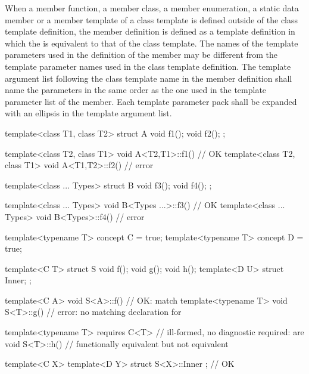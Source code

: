 \pnum
When a member function, a member class, a member enumeration, a static data member or
a member template of a class
template is defined outside of the class template definition,
the member definition is defined as a template definition in which the
 is equivalent to that
of the class template.
The names of the template parameters used in the definition of the member may
be different from the template parameter names used in the class
template definition.
The template argument list following the class template name in the member
definition shall name the parameters in the same order as the one used in
the template parameter list of the member. Each template
parameter pack shall be expanded with an ellipsis in the template
argument list.
\begin{example}
\begin{codeblock}
template<class T1, class T2> struct A {
  void f1();
  void f2();
};

template<class T2, class T1> void A<T2,T1>::f1() { }    // OK
template<class T2, class T1> void A<T1,T2>::f2() { }    // error
\end{codeblock}

\begin{codeblock}
template<class ... Types> struct B {
  void f3();
  void f4();
};

template<class ... Types> void B<Types ...>::f3() { }   // OK
template<class ... Types> void B<Types>::f4() { }       // error
\end{codeblock}

\begin{codeblock}
template<typename T> concept C = true;
template<typename T> concept D = true;

template<C T> struct S {
  void f();
  void g();
  void h();
  template<D U> struct Inner;
};

template<C A> void S<A>::f() { }        // OK:  match
template<typename T> void S<T>::g() { } // error: no matching declaration for 

template<typename T> requires C<T>      // ill-formed, no diagnostic required:  are
void S<T>::h() { }                      // functionally equivalent but not equivalent

template<C X> template<D Y>
struct S<X>::Inner { };                 // OK
\end{codeblock}
\end{example}

